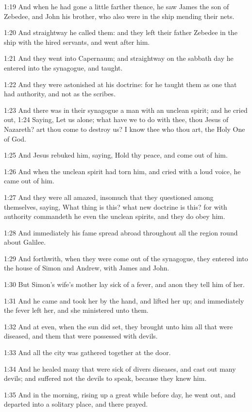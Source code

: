 1:19 And when he had gone a little farther thence, he saw James the son of Zebedee, and John his brother, who also were in the ship mending their nets.

1:20 And straightway he called them: and they left their father Zebedee in the ship with the hired servants, and went after him.

1:21 And they went into Capernaum; and straightway on the sabbath day he entered into the synagogue, and taught.

1:22 And they were astonished at his doctrine: for he taught them as one that had authority, and not as the scribes.

1:23 And there was in their synagogue a man with an unclean spirit; and he cried out, 1:24 Saying, Let us alone; what have we to do with thee, thou Jesus of Nazareth? art thou come to destroy us? I know thee who thou art, the Holy One of God.

1:25 And Jesus rebuked him, saying, Hold thy peace, and come out of him.

1:26 And when the unclean spirit had torn him, and cried with a loud voice, he came out of him.

1:27 And they were all amazed, insomuch that they questioned among themselves, saying, What thing is this? what new doctrine is this? for with authority commandeth he even the unclean spirits, and they do obey him.

1:28 And immediately his fame spread abroad throughout all the region round about Galilee.

1:29 And forthwith, when they were come out of the synagogue, they entered into the house of Simon and Andrew, with James and John.

1:30 But Simon's wife's mother lay sick of a fever, and anon they tell him of her.

1:31 And he came and took her by the hand, and lifted her up; and immediately the fever left her, and she ministered unto them.

1:32 And at even, when the sun did set, they brought unto him all that were diseased, and them that were possessed with devils.

1:33 And all the city was gathered together at the door.

1:34 And he healed many that were sick of divers diseases, and cast out many devils; and suffered not the devils to speak, because they knew him.

1:35 And in the morning, rising up a great while before day, he went out, and departed into a solitary place, and there prayed.

